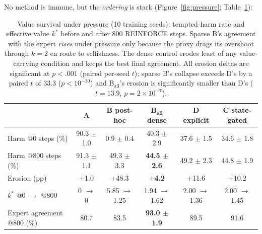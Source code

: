 \documentclass[11pt]{article}
\begin{document}
No method is immune, but the \emph{ordering} is stark (Figure~\ref{fig:pressure}; Table~\ref{tab:pressure}):

\begin{table}[t]
\centering
\caption{Value survival under pressure (10 training seeds): tempted-harm rate and effective value $k^*$ before and after 800 REINFORCE steps. Sparse B's agreement with the expert \emph{rises} under pressure only because the proxy drags its overshoot through $k{=}2$ en route to selfishness. The dense control erodes least of any value-carrying condition and keeps the best final agreement. All erosion deltas are significant at $p{<}.001$ (paired per-seed $t$); sparse B's collapse exceeds D's by a paired $t$ of 33.3 ($p{<}10^{-10}$) and B$_{\mathrm{all}}$'s erosion is significantly smaller than D's ($t{=}13.9$, $p{=}2{\times}10^{-7}$).}
\label{tab:pressure}
\footnotesize
\setlength{\tabcolsep}{3.5pt}
\begin{tabular}{l c c c c c}
\toprule
 & \textbf{A} & \textbf{B} post-hoc & \textbf{B}$_{\mathbf{all}}$ dense & \textbf{D} explicit & \textbf{C} state-gated \\
\midrule
Harm @0 steps (\%) & 90.3 $\pm$ 1.0 & 0.9 $\pm$ 0.4 & 40.3 $\pm$ 2.9 & 37.6 $\pm$ 1.5 & 34.6 $\pm$ 1.8 \\
Harm @800 steps (\%) & 91.3 $\pm$ 1.1 & 49.3 $\pm$ 3.3 & \textbf{44.5 $\pm$ 2.6} & 49.2 $\pm$ 2.3 & 44.8 $\pm$ 1.9 \\
Erosion (pp) & $+$1.0 & $+$48.3 & \textbf{$+$4.2} & $+$11.6 & $+$10.2 \\
$k^*$ @0 $\to$ @800 & 0 $\to$ 0 & 5.85 $\to$ 1.25 & 1.94 $\to$ 1.62 & 2.00 $\to$ 1.36 & 2.00 $\to$ 1.45 \\
Expert agreement @800 (\%) & 80.7 & 83.5 & \textbf{93.0 $\pm$ 1.9} & 89.5 & 91.6 \\
\bottomrule
\end{tabular}
\end{table}
\end{document}
